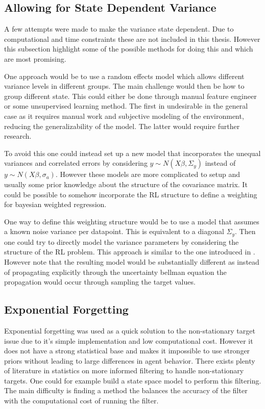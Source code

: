 \subsection{Allowing for State Dependent Variance}

A few attempts were made to make the variance state dependent. Due to computational and time constraints these are not included in this thesis. However this subsection highlight some of the possible methods for doing this and which are most promising.

One approach would be to use a random effects model\citep[p.~382-383]{gelman_2013} which allows different variance levels in different groups. The main challenge would then be how to group different state. This could either be done through manual feature engineer or some unsupervised learning method. The first in undesirable in the general case as it requires manual work and subjective modeling of the environment, reducing the generalizability of the model. The latter would require further research.

To avoid this one could instead set up a new model that incorporates the unequal variances and correlated errors by considering $y \sim N(X\beta, \Sigma_y)$ instead of $y \sim N(X\beta, \sigma_a)$.  However these models are more complicated to setup and usually some prior knowledge about the structure of the covariance matrix. It could be possible to somehow incorporate the RL structure to define a weighting for bayesian weighted regression\citep[p.~370-373]{gelman_2013}. 

One way to define this weighting structure would be to use a model that assumes a known noise variance per datapoint. This is equivalent to a diagonal $\Sigma_y$. Then one could try to directly model the variance parameters by considering the structure of the RL problem. This approach is similar to the one introduced in \cite{donoghue_2017}. However note that the resulting model would be substantially different as instead of propagating explicitly through the uncertainty bellman equation the propagation would occur through sampling the target values.

\subsection{Exponential Forgetting}

Exponential forgetting was used as a quick solution to the non-stationary target issue due to it's simple implementation and low computational cost. However it does not have a strong statistical base and makes it impossible to use stronger priors without leading to large differences in agent behavior. There exists plenty of literature in statistics on more informed filtering to handle non-stationary targets. One could for example build a state space model to perform this filtering. The main difficulty is finding a method the balances the accuracy of the filter with the computational cost of running the filter.

